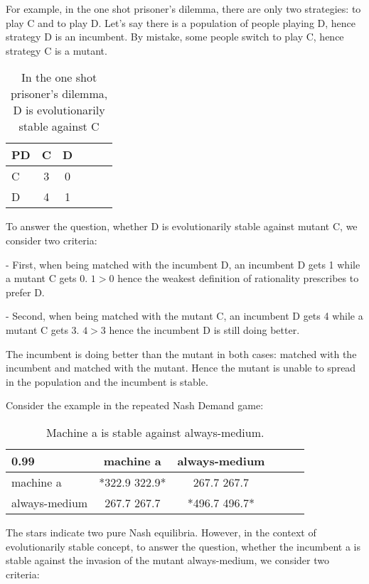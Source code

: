 \documentclass[12.5pt]{report}
\begin{document}
For example, in the one shot prisoner's dilemma, there are only two strategies: to play C and to play D. Let's say there is a population of people playing D, hence strategy D is an incumbent. By mistake, some people switch to play C, hence strategy C is a mutant.

\begin{table}[h!]
\center
\begin{tabular}{l|ccccc}
\textbf{PD}& C & D \\
\hline
C & 3 &  0   \\
D &  4  & 1   \\
\end{tabular}
\caption{In the one shot prisoner's dilemma, D is evolutionarily stable against C}
\end{table}

To answer the question, whether D is evolutionarily stable against mutant C, we consider two criteria:

- First, when being matched with the incumbent D, an incumbent D gets 1 while a mutant C gets 0. $1 > 0$ hence the weakest definition of rationality prescribes to prefer D.

- Second, when being matched with the mutant C, an incumbent D gets 4 while a mutant C gets 3. $4 > 3$ hence the incumbent D is still doing better.

The incumbent is doing better than the mutant in both cases: matched with the incumbent and matched with the mutant. Hence the mutant is unable to spread in the population and the incumbent is stable.


Consider the example in the repeated Nash Demand game:

\begin{table}[h!]
\center
\begin{tabular}{l|ccccc}
\textbf{0.99}& machine a & always-medium \\
\hline
machine a & *322.9 322.9* &   267.7 267.7   \\
always-medium  &  267.7 267.7  &    *496.7 496.7*  \\
\end{tabular}
\caption{Machine a is stable against always-medium.}
\end{table}

The stars indicate two pure Nash equilibria. However, in the context of evolutionarily stable concept, to answer the question, whether the incumbent a is stable against the invasion of the mutant always-medium, we consider two criteria:
\end{document}
